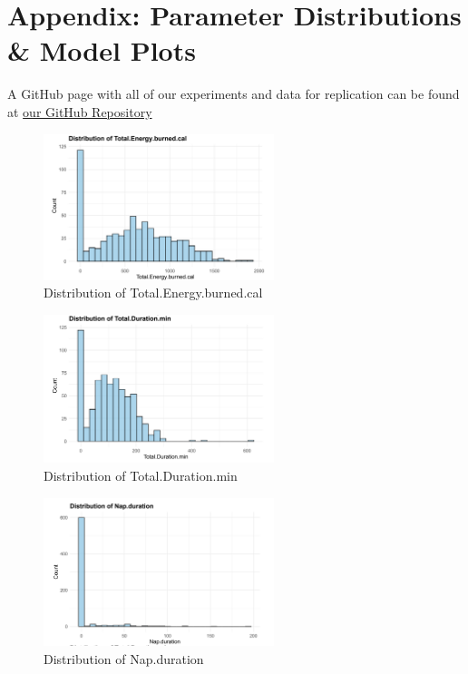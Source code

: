 \documentclass{article}
\begin{document}
\newpage


\section{Appendix: Parameter Distributions \& Model Plots}

A GitHub page with all of our experiments and data for replication can be found at \href{https://github.com/drooryck/whoop-sleep}{our GitHub Repository}


\begin{figure}[h!]
  \centering
  \includegraphics[width=0.6\textwidth]{images/Total_Energy_burned_cal.png}
  \caption{Distribution of Total.Energy.burned.cal}
  \label{fig:total_energy_burned}
\end{figure}

\begin{figure}[h!]
  \centering
  \includegraphics[width=0.6\textwidth]{images/Total_Duration_min.png}
  \caption{Distribution of Total.Duration.min}
  \label{fig:total_duration}
\end{figure}

\begin{figure}[h!]
  \centering
  \includegraphics[width=0.6\textwidth]{images/Nap_duration.png}
  \caption{Distribution of Nap.duration}
  \label{fig:nap_duration}
\end{figure}
\end{document}
